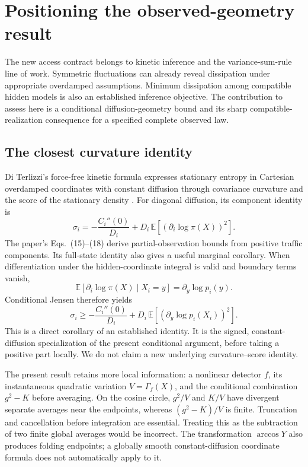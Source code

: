 \chapter{Positioning the observed-geometry result}
\label{ch:og-literature}

The new access contract belongs to kinetic inference and the variance-sum-rule
line of work. Symmetric fluctuations can already reveal dissipation under
appropriate overdamped assumptions. Minimum dissipation among compatible
hidden models is also an established inference objective. The contribution
to assess here is a conditional diffusion-geometry bound and its sharp
compatible-realization consequence for a specified complete observed law.

\section{The closest curvature identity}
Di Terlizzi's force-free kinetic formula expresses stationary entropy in
Cartesian overdamped coordinates with constant diffusion through covariance
curvature and the score of the stationary density
\cite{ogDiTerlizzi2025}. For diagonal diffusion, its component identity is
\begin{equation}
 \sigma_i=-\frac{C_i''(0)}{D_i}
       +D_i\,\mathbb E[(\partial_i\log\pi(X))^2].
 \label{eq:og-prior-traffic}
\end{equation}
The paper's Eqs.~(15)--(18) derive partial-observation bounds from positive
traffic components. Its full-state identity also gives a useful marginal
corollary. When differentiation under the hidden-coordinate integral is
valid and boundary terms vanish,
\[
 \mathbb E[\partial_i\log\pi(X)\mid X_i=y]
       =\partial_y\log p_i(y).
\]
Conditional Jensen therefore yields
\begin{equation}
 \sigma_i\ge -\frac{C_i''(0)}{D_i}
       +D_i\,\mathbb E[(\partial_y\log p_i(X_i))^2].
 \label{eq:og-marginal-prior-corollary}
\end{equation}
This is a direct corollary of an established identity. It is the signed,
constant-diffusion specialization of the present conditional argument, before
taking a positive part locally. We do not claim a new underlying
curvature--score identity.

The present result retains more local information: a nonlinear detector
$f$, its instantaneous quadratic variation $V=\Gamma_f(X)$, and the
conditional combination $g^2-K$ before averaging. On the cosine circle,
$g^2/V$ and $K/V$ have divergent separate averages near the endpoints,
whereas $(g^2-K)/V$ is finite. Truncation and cancellation before integration
are essential. Treating this as the subtraction of two finite global
averages would be incorrect. The transformation $\arccos Y$ also produces
folding endpoints; a globally smooth constant-diffusion coordinate formula
does not automatically apply to it.

